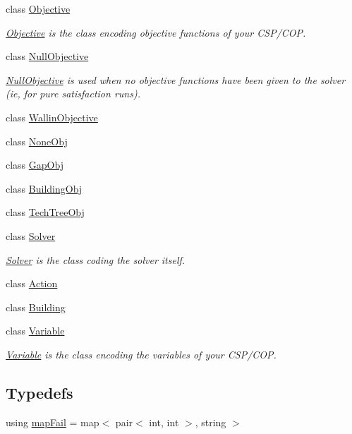 \begin{DoxyCompactItemize}
class \hyperlink{classghost_1_1Objective}{Objective}
\begin{DoxyCompactList}\small\item\em \hyperlink{classghost_1_1Objective}{Objective} is the class encoding objective functions of your C\-S\-P/\-C\-O\-P. \end{DoxyCompactList}\item 
class \hyperlink{classghost_1_1NullObjective}{Null\-Objective}
\begin{DoxyCompactList}\small\item\em \hyperlink{classghost_1_1NullObjective}{Null\-Objective} is used when no objective functions have been given to the solver (ie, for pure satisfaction runs). \end{DoxyCompactList}\item 
class \hyperlink{classghost_1_1WallinObjective}{Wallin\-Objective}
\item 
class \hyperlink{classghost_1_1NoneObj}{None\-Obj}
\item 
class \hyperlink{classghost_1_1GapObj}{Gap\-Obj}
\item 
class \hyperlink{classghost_1_1BuildingObj}{Building\-Obj}
\item 
class \hyperlink{classghost_1_1TechTreeObj}{Tech\-Tree\-Obj}
\item 
class \hyperlink{classghost_1_1Solver}{Solver}
\begin{DoxyCompactList}\small\item\em \hyperlink{classghost_1_1Solver}{Solver} is the class coding the solver itself. \end{DoxyCompactList}\item 
class \hyperlink{classghost_1_1Action}{Action}
\item 
class \hyperlink{classghost_1_1Building}{Building}
\item 
class \hyperlink{classghost_1_1Variable}{Variable}
\begin{DoxyCompactList}\small\item\em \hyperlink{classghost_1_1Variable}{Variable} is the class encoding the variables of your C\-S\-P/\-C\-O\-P. \end{DoxyCompactList}\end{DoxyCompactItemize}
\subsection*{Typedefs}
\begin{DoxyCompactItemize}
\item 
using \hyperlink{namespaceghost_af44c393431f46e255b1c303cd50854b8}{map\-Fail} = map$<$ pair$<$ int, int $>$, string $>$
\end{DoxyCompactItemize}
